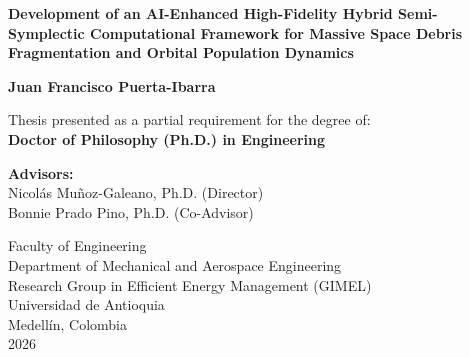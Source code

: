 \begin{titlepage}
\begin{center}
    \vspace*{0.5cm}
    {\LARGE \bfseries Development of an AI-Enhanced High-Fidelity Hybrid Semi-Symplectic Computational Framework for Massive Space Debris Fragmentation and Orbital Population Dynamics \par}
    
    \vspace{1.8cm}
    {\Large \textbf{Juan Francisco Puerta-Ibarra} \par}
    
    \vspace{2.0cm}
    {\normalsize Thesis presented as a partial requirement for the degree of: \\
    \textbf{Doctor of Philosophy (Ph.D.) in Engineering} \par}
    
    \vspace{2.0cm}
    {\normalsize
    \textbf{Advisors:} \\
    Nicolás Muñoz-Galeano, Ph.D. (Director) \\
    Bonnie Prado Pino, Ph.D. (Co-Advisor) \par}
    
    \vfill
    {\normalsize
    Faculty of Engineering \\
    Department of Mechanical and Aerospace Engineering \\
    Research Group in Efficient Energy Management (GIMEL) \\
    Universidad de Antioquia \\
    Medellín, Colombia \\
    2026 \par}
\end{center}
\end{titlepage}